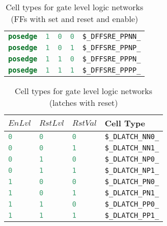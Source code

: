 \begin{table}[t]
\begin{tabular}[t]{lllll}
\lstinline[language=Verilog];posedge; & \lstinline[language=Verilog];1; & \lstinline[language=Verilog];0; & \lstinline[language=Verilog];0; & {\tt \$\_DFFSRE\_PPNN\_} \\
\lstinline[language=Verilog];posedge; & \lstinline[language=Verilog];1; & \lstinline[language=Verilog];0; & \lstinline[language=Verilog];1; & {\tt \$\_DFFSRE\_PPNP\_} \\
\lstinline[language=Verilog];posedge; & \lstinline[language=Verilog];1; & \lstinline[language=Verilog];1; & \lstinline[language=Verilog];0; & {\tt \$\_DFFSRE\_PPPN\_} \\
\lstinline[language=Verilog];posedge; & \lstinline[language=Verilog];1; & \lstinline[language=Verilog];1; & \lstinline[language=Verilog];1; & {\tt \$\_DFFSRE\_PPPP\_} \\
\end{tabular}
\caption{Cell types for gate level logic networks (FFs with set and reset and enable)}
\label{tab:CellLib_gates_dffsre}
\end{table}

\begin{table}[t]
\hfil
\begin{tabular}[t]{llll}
$EnLvl$ & $RstLvl$ & $RstVal$ & Cell Type \\
\hline
\lstinline[language=Verilog];0; & \lstinline[language=Verilog];0; & \lstinline[language=Verilog];0; & {\tt \$\_DLATCH\_NN0\_} \\
\lstinline[language=Verilog];0; & \lstinline[language=Verilog];0; & \lstinline[language=Verilog];1; & {\tt \$\_DLATCH\_NN1\_} \\
\lstinline[language=Verilog];0; & \lstinline[language=Verilog];1; & \lstinline[language=Verilog];0; & {\tt \$\_DLATCH\_NP0\_} \\
\lstinline[language=Verilog];0; & \lstinline[language=Verilog];1; & \lstinline[language=Verilog];1; & {\tt \$\_DLATCH\_NP1\_} \\
\lstinline[language=Verilog];1; & \lstinline[language=Verilog];0; & \lstinline[language=Verilog];0; & {\tt \$\_DLATCH\_PN0\_} \\
\lstinline[language=Verilog];1; & \lstinline[language=Verilog];0; & \lstinline[language=Verilog];1; & {\tt \$\_DLATCH\_PN1\_} \\
\lstinline[language=Verilog];1; & \lstinline[language=Verilog];1; & \lstinline[language=Verilog];0; & {\tt \$\_DLATCH\_PP0\_} \\
\lstinline[language=Verilog];1; & \lstinline[language=Verilog];1; & \lstinline[language=Verilog];1; & {\tt \$\_DLATCH\_PP1\_} \\
\end{tabular}
\caption{Cell types for gate level logic networks (latches with reset)}
\label{tab:CellLib_gates_adlatch}
\end{table}

